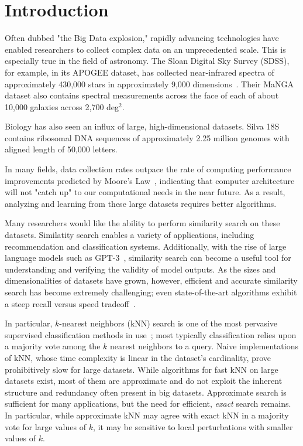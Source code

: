 \section{Introduction}
\label{sec:introduction}
Often dubbed "the Big Data explosion," rapidly advancing technologies have enabled researchers to collect complex data on an unprecedented scale. 
This is especially true in the field of astronomy. 
The Sloan Digital Sky Survey (SDSS), for example, in its APOGEE dataset, has collected near-infrared spectra of approximately 430,000 stars in approximately 9,000 dimensions~\cite{alam2015eleventh}. 
Their MaNGA dataset also contains spectral measurements across the face of each of about 10,000 galaxies across 2,700 deg$^2$.

Biology has also seen an influx of large, high-dimensional datasets. Silva 18S contains ribosomal DNA sequences of approximately 2.25 
million genomes with aligned length of 50,000 letters. 


In many fields, data collection rates outpace the rate of computing performance improvements predicted by Moore's Law~\cite{moore1965cramming}, indicating 
that computer architecture will not "catch up" to our computational needs in the near future. As a result, analyzing and learning from these large datasets 
requires better algorithms. 

Many researchers would like the ability to perform similarity search on these datasets. 
Similatity search enables a variety of applications, including recommendation and classification systems. 
Additionally, with the rise of large language models such as GPT-3~\cite{brown2020language}, similarity search can become a useful tool for 
understanding and verifying the validity of model outputs. 
As the sizes and dimensionalities of datasets have grown, however, efficient and accurate similarity search has become extremely challenging; 
even state-of-the-art algorithms exhibit a steep recall versus speed tradeoff~\cite{ishaq2019clustered}.


In particular, $k$-nearest neighbors (kNN) search is one of the most pervasive supervised classification methods in use~\cite{fix1952discriminatory, cover1967nearest}; most typically classification relies upon a majority vote among the $k$ nearest neighbors to a query.
Naive implementations of kNN, whose time complexity is linear in the dataset's cardinality, 
prove prohibitively slow for large datasets. While algorithms for fast kNN on large datasets exist, most of them are approximate and do not 
exploit the inherent structure and redundancy often present in big datasets. Approximate search is sufficient for many applications, but the 
need for efficient, \emph{exact} search remains.
In particular, while approximate kNN may agree with exact kNN in a majority vote for large values of $k$, it may be sensitive to local perturbations with smaller values of $k$.


